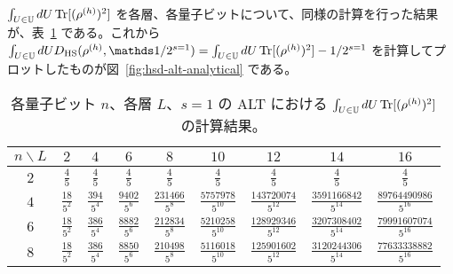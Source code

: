 $\int_{U\in\mathbb{U}} dU \operatorname{Tr}[(\rho^{(h)})^2]$ を各層、各量子ビットについて、同様の計算を行った結果が、表~\ref{tab:alt-tr-int} である。これから $\int_{U\in\bbU} dU D_{\HS} (\rho^{(h)} , \bbid/2^{s=1}) = \int_{U\in\bbU} dU \operatorname{Tr}[(\rho^{(h)})^2] - 1/2^{s=1}$ を計算してプロットしたものが図~\ref{fig:hsd-alt-analytical} である。

\begin{table}[H]
    \centering
    \caption{各量子ビット $n$、各層 $L$、$s = 1$ の ALT における $\int_{U\in\mathbb{U}} dU \operatorname{Tr}[(\rho^{(h)})^2]$ の計算結果。}
    \label{tab:alt-tr-int}
    \begin{tabular}{c|cccccccc}
        \hline
        $n \backslash L$ & $2$ & $4$ & $6$ & $8$ & $10$ & $12$& $14$ & $16$\\
        \hline
        $2$ & $\frac45$ & $\frac45$ &  $\frac45$ &  $\frac45$ &  $\frac45$ & $\frac45$ & $\frac45$ & $\frac45$ \\
        $4$ & $\frac{18}{5^2}$ & $\frac{394}{5^4}$ & $\frac{9402}{5^6}$ & $\frac{231466}{5^8}$ & $\frac{5757978}{5^{10}}$ & $\frac{143720074}{5^{12}}$ & $\frac{3591166842}{5^{14}}$ & $\frac{89764490986}{5^{16}}$\\
        $6$ &$\frac{18}{5^2}$ & $\frac{386}{5^4}$ & $\frac{8882}{5^6}$ & $\frac{212834}{5^8}$ & $\frac{5210258}{5^{10}}$ & $\frac{128929346}{5^{12}}$ & $\frac{3207308402}{5^{14}}$ & $\frac{79991607074}{5^{16}}$\\
        $8$ & $\frac{18}{5^2}$ & $\frac{386}{5^4}$ & $\frac{8850}{5^6}$ & $\frac{210498}{5^8}$ & $\frac{5116018}{5^{10}}$ & $\frac{125901602}{5^{12}}$ & $\frac{3120244306}{5^{14}}$ & $\frac{77633338882}{5^{16}}$\\
        \hline
    \end{tabular}
\end{table}
